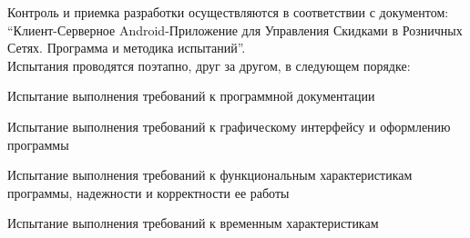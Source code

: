 Контроль и приемка разработки осуществляются в соответствии с документом: 
``Клиент-Серверное Android-Приложение для Управления Скидками в Розничных Сетях. 
Программа и методика испытаний''. \\
Испытания проводятся поэтапно, друг за другом, в следующем порядке:
\begin{my_enumerate}
	\item Испытание выполнения требований к программной документации
	\item Испытание выполнения требований к графическому интерфейсу и оформлению программы
	\item Испытание выполнения требований к функциональным характеристикам программы, надежности и корректности ее работы
	\item Испытание выполнения требований к временным характеристикам
\end{my_enumerate}
